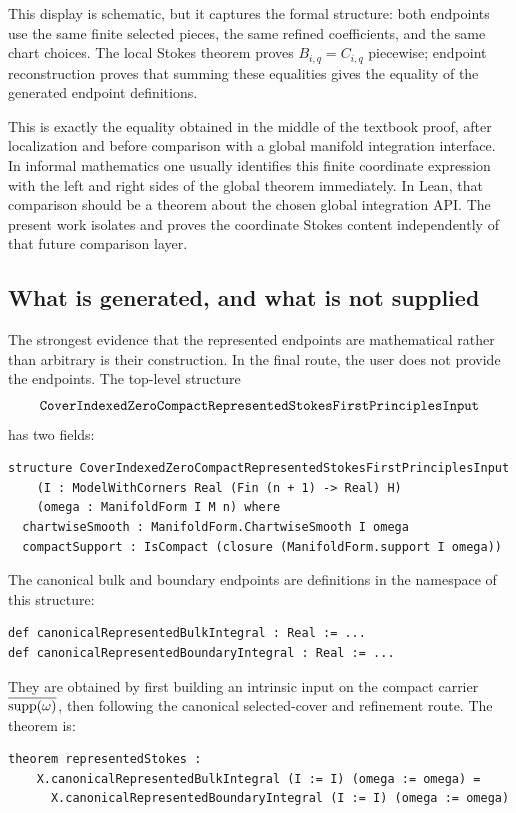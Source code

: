This display is schematic, but it captures the formal structure: both
endpoints use the same finite selected pieces, the same refined coefficients,
and the same chart choices.  The local Stokes theorem proves \(B_{i,q}=C_{i,q}\)
piecewise; endpoint reconstruction proves that summing these equalities gives
the equality of the generated endpoint definitions.

This is exactly the equality obtained in the middle of the textbook proof,
after localization and before comparison with a global manifold integration
interface.  In informal mathematics one usually identifies this finite
coordinate expression with the left and right sides of the global theorem
immediately.  In Lean, that comparison should be a theorem about the chosen
global integration API.  The present work isolates and proves the coordinate
Stokes content independently of that future comparison layer.

\subsection{What is generated, and what is not supplied}

The strongest evidence that the represented endpoints are mathematical rather
than arbitrary is their construction.  In the final route, the user does not
provide the endpoints.  The top-level structure
\[
\code{CoverIndexedZeroCompactRepresentedStokesFirstPrinciplesInput}
\]
has two fields:
\begin{lstlisting}[language=Lean]
structure CoverIndexedZeroCompactRepresentedStokesFirstPrinciplesInput
    (I : ModelWithCorners Real (Fin (n + 1) -> Real) H)
    (omega : ManifoldForm I M n) where
  chartwiseSmooth : ManifoldForm.ChartwiseSmooth I omega
  compactSupport : IsCompact (closure (ManifoldForm.support I omega))
\end{lstlisting}
The canonical bulk and boundary endpoints are definitions in the namespace of
this structure:
\begin{lstlisting}[language=Lean]
def canonicalRepresentedBulkIntegral : Real := ...
def canonicalRepresentedBoundaryIntegral : Real := ...
\end{lstlisting}
They are obtained by first building an intrinsic input on the compact carrier
\(\overline{\operatorname{supp}(\omega)}\), then following the canonical selected-cover and
refinement route.  The theorem is:
\begin{lstlisting}[language=Lean]
theorem representedStokes :
    X.canonicalRepresentedBulkIntegral (I := I) (omega := omega) =
      X.canonicalRepresentedBoundaryIntegral (I := I) (omega := omega)
\end{lstlisting}

